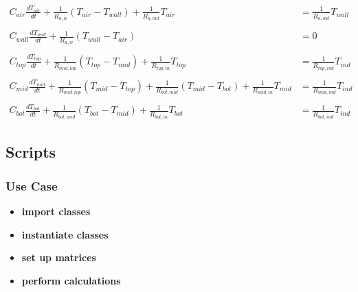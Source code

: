 	\begin{equation}
		\begin{aligned}
			C_{air}\frac{dT_{air}}{dt} + \frac{1}{R_{a,w}} (T_{air}-T_{wall}) + \frac{1}{R_{a,out}} T_{air} &= \frac{1}{R_{a,out}} T_{wall} \\ \\
			C_{wall}\frac{dT_{wall}}{dt} + \frac{1}{R_{a,w}} (T_{wall}-T_{air}) &= 0 \\ \\			
			C_{top}\frac{dT_{top}}{dt} + \frac{1}{R_{mid, top}} (T_{top}-T_{mid}) + \frac{1}{R_{top, in}} T_{top} &= \frac{1}{R_{top, ind}} T_{ind}
			\\ \\
			C_{mid}\frac{dT_{mid}}{dt} + \frac{1}{R_{mid, top}} (T_{mid} - T_{top}) + \frac{1}{R_{bot, mid}}(T_{mid}-T_{bot}) + \frac{1}{R_{mid, in}} T_{mid} &= \frac{1}{R_{mid, ind}} T_{ind} \\ \\ 
			C_{bot}\frac{dT_{bot}}{dt} + \frac{1}{R_{bot, mid}} (T_{bot} - T_{mid}) + \frac{1}{R_{bot, in}} T_{bot} &= \frac{1}{R_{bot, ind}} T_{ind} 
		\end{aligned}
	\end{equation}

\newpage


\subsection{Scripts}

\subsubsection{Use Case}

\begin{itemize}
	\item \textbf{import classes}
\end{itemize}

\begin{itemize}
	\item \textbf{instantiate classes}
\end{itemize}

\begin{itemize}
	\item \textbf{set up matrices}
\end{itemize}

\begin{itemize}
	\item \textbf{perform calculations}
\end{itemize}

